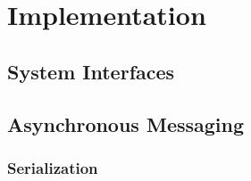 \chapter{Implementation}\label{ch:impl}



\section{System Interfaces}



\section{Asynchronous Messaging}

\subsection{Serialization}


